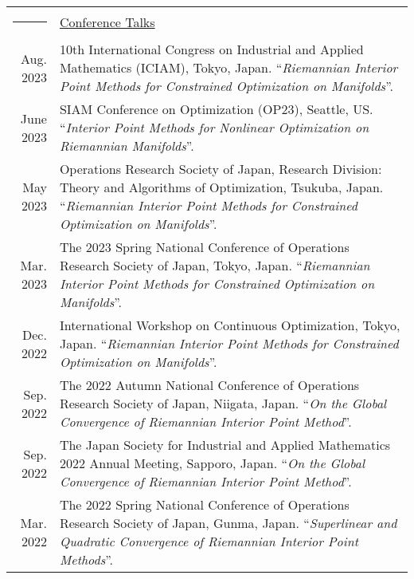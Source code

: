 \documentclass[a4paper,11pt]{article}
\newcommand{\headingfont}{\LARGE \MakeUppercase }
\newenvironment{SectionTable}[1]{
	\renewcommand*{\arraystretch}{1.0}
	\setlength{\tabcolsep}{10pt}
	\begin{longtable}{Rp{5.2in}} 
		\rule{2.3cm}{4pt} 
		& \underline{#1} \\ %
	}
	{
	\end{longtable}\vspace{-.3cm}
}
\begin{document}
\begin{SectionTable}{\headingfont Conference Talks}
	Aug. 2023 & 10th International Congress on Industrial and Applied Mathematics (ICIAM), Tokyo, Japan.  \newline ``\textit{Riemannian Interior Point Methods for Constrained Optimization on Manifolds}''. \\
	
	June 2023 & SIAM Conference on Optimization (OP23), Seattle, US.  
	 \newline ``\textit{Interior Point Methods for Nonlinear Optimization on Riemannian Manifolds}''. \\
	
	May 2023 & Operations Research Society of Japan, Research Division: Theory and Algorithms of Optimization, Tsukuba, Japan.  
	 \newline ``\textit{Riemannian Interior Point Methods for Constrained Optimization on Manifolds}''. \\
	
	Mar. 2023 & The 2023 Spring National Conference of Operations Research Society of Japan, Tokyo, Japan.  
	 \newline ``\textit{Riemannian Interior Point Methods for Constrained Optimization on Manifolds}''. \\
	
	Dec. 2022 & International Workshop on Continuous Optimization, Tokyo, Japan.  
	 \newline ``\textit{Riemannian Interior Point Methods for Constrained Optimization on Manifolds}''. \\
	
	Sep. 2022 & The 2022 Autumn National Conference of Operations Research Society of Japan, Niigata, Japan. 
	 \newline ``\textit{On the Global Convergence of Riemannian Interior Point Method}''.\\
	
	Sep. 2022 & The Japan Society for Industrial and Applied Mathematics 2022 Annual Meeting, Sapporo, Japan. 
	 \newline ``\textit{On the Global Convergence of Riemannian Interior Point Method}''.\\
	
	Mar. 2022 & The 2022 Spring National Conference of Operations Research Society of Japan, Gunma, Japan.
	 \newline ``\textit{Superlinear and Quadratic Convergence of Riemannian Interior Point Methods}''. \\
	

\end{SectionTable}
\end{document}
